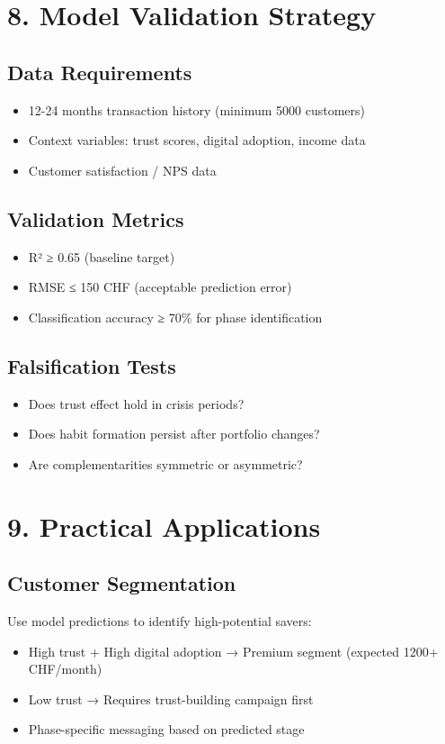 \documentclass[11pt,a4paper]{article}
\begin{document}
\section{8. Model Validation Strategy}

\subsection{Data Requirements}
\begin{itemize}
\item 12-24 months transaction history (minimum 5000 customers)
\item Context variables: trust scores, digital adoption, income data
\item Customer satisfaction / NPS data
\end{itemize}

\subsection{Validation Metrics}
\begin{itemize}
\item R² ≥ 0.65 (baseline target)
\item RMSE ≤ 150 CHF (acceptable prediction error)
\item Classification accuracy ≥ 70\% for phase identification
\end{itemize}

\subsection{Falsification Tests}
\begin{itemize}
\item Does trust effect hold in crisis periods?
\item Does habit formation persist after portfolio changes?
\item Are complementarities symmetric or asymmetric?
\end{itemize}

\section{9. Practical Applications}

\subsection{Customer Segmentation}
Use model predictions to identify high-potential savers:
\begin{itemize}
\item High trust + High digital adoption → Premium segment (expected 1200+ CHF/month)
\item Low trust → Requires trust-building campaign first
\item Phase-specific messaging based on predicted stage
\end{itemize}
\end{document}

